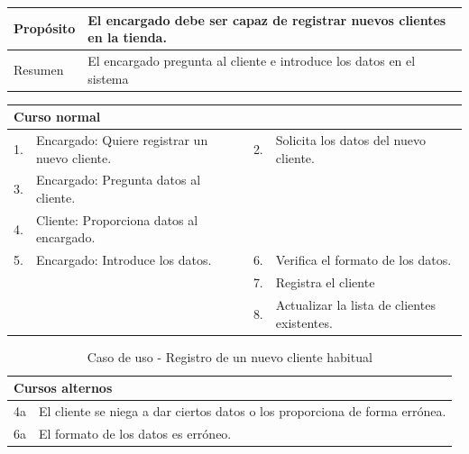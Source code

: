 \begin{table}[H]
	\centering
	\begin{tabular}{| m{} | m{} | m{} | m{} |}
		\hline
		Propósito & \multicolumn{3}{m{0.67\textwidth}|}{El encargado debe ser capaz de registrar nuevos clientes en la tienda.}  \\ 
		\hline
		Resumen & \multicolumn{3}{m{0.67\textwidth}|}{El encargado pregunta al cliente e introduce los datos en el sistema} \\ 
		\hline
	\end{tabular}
\end{table}


\begin{table}[H]
	\centering
	\begin{tabular}{| m{} | m{} | m{} | m{} |}
		\hline
		\multicolumn{4}{|m{0.9\textwidth}|}{Curso normal}     \\ 
		\hline
		1. & Encargado: Quiere registrar un nuevo cliente. & 2. &  Solicita los datos del nuevo cliente.  \\ 
		\hline
		3. & Encargado: Pregunta datos al cliente. &  &   \\ 
		\hline
		4. & Cliente: Proporciona datos al encargado. &  &   \\ 
		\hline
		5. & Encargado: Introduce los datos. & 6. & Verifica el formato de los datos. \\ 
		\hline
		&  & 7. & Registra el cliente \\ 
		\hline
		&  & 8. & Actualizar la lista de clientes existentes. \\ 
		\hline
	\end{tabular}
\end{table}

\begin{table}[H]
	\centering
	\begin{tabular}{| m{} | m{} | m{} | m{} |}
		\hline
		\multicolumn{4}{|m{0.9\textwidth}|}{Cursos alternos}     \\ 
		\hline
		4a & \multicolumn{3}{m{0.67\textwidth}|}{El cliente se niega a dar ciertos datos o los proporciona de forma errónea.} \\ 
		\hline
		6a & \multicolumn{3}{m{0.67\textwidth}|}{El formato de los datos es erróneo.} \\ 
		\hline
	\end{tabular}
	\caption{Caso de uso - Registro de un nuevo cliente habitual}
\end{table}

